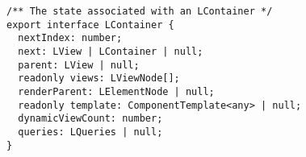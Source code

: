 \begin{verbatim}
/** The state associated with an LContainer */
export interface LContainer {
  nextIndex: number;
  next: LView | LContainer | null;
  parent: LView | null;
  readonly views: LViewNode[];
  renderParent: LElementNode | null;
  readonly template: ComponentTemplate<any> | null;
  dynamicViewCount: number;
  queries: LQueries | null;
}
\end{verbatim}

